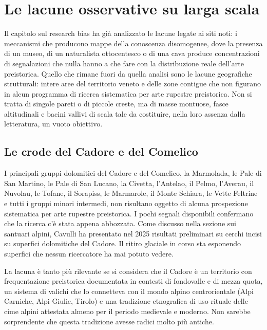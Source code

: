 \section{Le lacune osservative su larga scala}

Il capitolo sul research bias ha già analizzato le lacune legate ai siti noti: i meccanismi che producono mappe della conoscenza disomogenee, dove la presenza di un museo, di un naturalista ottocentesco o di una cava produce concentrazioni di segnalazioni che nulla hanno a che fare con la distribuzione reale dell'arte preistorica. Quello che rimane fuori da quella analisi sono le lacune geografiche strutturali: intere aree del territorio veneto e delle zone contigue che non figurano in alcun programma di ricerca sistematica per arte rupestre preistorica. Non si tratta di singole pareti o di piccole creste, ma di masse montuose, fasce altitudinali e bacini vallivi di scala tale da costituire, nella loro assenza dalla letteratura, un vuoto obiettivo.

\subsection*{Le crode del Cadore e del Comelico}

I principali gruppi dolomitici del Cadore e del Comelico, la Marmolada, le Pale di San Martino, le Pale di San Lucano, la Civetta, l'Antelao, il Pelmo, l'Averau, il Nuvolau, le Tofane, il Sorapiss, le Marmarole, il Monte Schiara, le Vette Feltrine e tutti i gruppi minori intermedi, non risultano oggetto di alcuna prospezione sistematica per arte rupestre preistorica. I pochi segnali disponibili confermano che la ricerca c'è stata appena abbozzata. Come discusso nella sezione sui santuari alpini, Cavulli ha presentato nel 2025 risultati preliminari su cerchi incisi su superfici dolomitiche del Cadore. Il ritiro glaciale in corso sta esponendo superfici che nessun ricercatore ha mai potuto vedere.

La lacuna è tanto più rilevante se si considera che il Cadore è un territorio con frequentazione preistorica documentata in contesti di fondovalle e di mezza quota, un sistema di valichi che lo connetteva con il mondo alpino centrorientale (Alpi Carniche, Alpi Giulie, Tirolo) e una tradizione etnografica di uso rituale delle cime alpini attestata almeno per il periodo medievale e moderno. Non sarebbe sorprendente che questa tradizione avesse radici molto più antiche.


